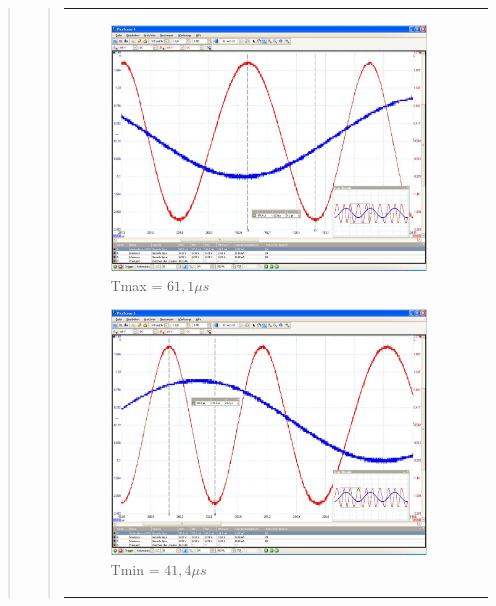 \begin{quote}
\begin{quote}
\begin{center}
\begin{tabular}{ll}
\begin{minipage}{0.6\textwidth}
                \begin{figure}[H]
                    \label{fig:Tmax}
                    \includegraphics[scale=0.25, trim = 0mm 0mm 0mm 0mm, clip]{Bilder/Tmax}
                    \caption{Tmax = $61,1 \mu s$}
                \end{figure}
        
            \end{minipage}
        
            \begin{minipage}{0.6\textwidth}
                \begin{figure}[H]
                    \label{fig:Tmin}
                    \includegraphics[scale=0.25, trim = 0mm 0mm 0mm 0mm, clip]{Bilder/Tmin}
                    \caption{Tmin = $41,4 \mu s$}
                \end{figure}
        

\end{minipage}
\end{tabular}
\end{center}
\end{quote}
\end{quote}
